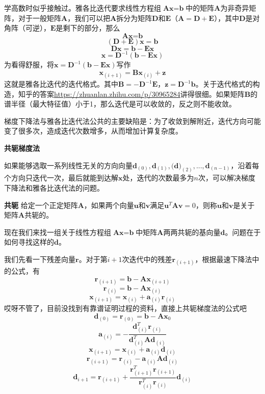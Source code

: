 \documentclass{article}
\begin{document}
					学高数时似乎接触过。雅各比迭代要求线性方程组$\textbf{A}\textbf{x}=\textbf{b}$中的矩阵$\textbf{A}$为非奇异矩阵，对于一般矩阵$\textbf{A}$，我们可以把$\textbf{A}$拆分为矩阵$\textbf{D}$和$\textbf{E}$（$\textbf{A}=\textbf{D}+\textbf{E}$），其中$\textbf{D}$是对角阵（可逆），$\textbf{E}$是剩下的部分，那么
					$$\textbf{A}\textbf{x}=\textbf{b}$$
					$$(\textbf{D}+\textbf{E})\textbf{x}=\textbf{b}$$
					$$\textbf{D}\textbf{x}=\textbf{b}-\textbf{E}\textbf{x}$$
					$$\textbf{x}=\textbf{D}^{-1}(\textbf{b}-\textbf{E}\textbf{x})$$
					为看得舒服，将$\textbf{x}=\textbf{D}^{-1}(\textbf{b}-\textbf{E}\textbf{x})$写作
					$$\textbf{x}_{(i+1)}=\textbf{B}\textbf{x}_{(i)}+\textbf{z}$$
					这就是雅各比迭代的迭代格式。其中$\textbf{B}=-\textbf{D}^{-1}\textbf{E}$，$\textbf{z}=\textbf{D}^{-1}\textbf{b}$。关于迭代格式的构造，知乎的答案\url{https://zhuanlan.zhihu.com/p/30965284}讲得很细。如果矩阵$\textbf{B}$的谱半径（最大特征值）小于1，那么迭代是可以收敛的，反之则不能收敛。
					
					梯度下降法与雅各比迭代法公共的主要缺陷是：为了收敛到解附近，迭代方向可能变了很多次，造成迭代次数增多，从而增加计算复杂度。
					
					\textbf{共轭梯度法}
					
					如果能够选取一系列线性无关的方向向量$\textbf{d}_{(0)},\textbf{d}_{(1)},\textbf{(d)}_{(2)},...,\textbf{d}_{(n-1)}$，沿着每个方向只迭代一次，最后就能到达解$\textbf{x}$处，迭代的次数最多为$n$次，可以解决梯度下降法和雅各比迭代法的问题。
					
					\textbf{共轭} 给定一个正定矩阵$\textbf{A}$，如果两个向量$\textbf{u}$和$\textbf{v}$满足$\textbf{u}^{T}\textbf{A}\textbf{v}=0$，则称$\textbf{u}$和$\textbf{v}$是关于矩阵$\textbf{A}$共轭的。
					
					现在我们来找一组关于线性方程组$\textbf{A}\textbf{x}=\textbf{b}$中矩阵$\textbf{A}$两两共轭的基向量$\textbf{d}$。问题在于如何寻找这样的$\textbf{d}$。
					
					我们先看一下残差向量$\textbf{r}$。对于第$i+1$次迭代中的残差$\textbf{r}_{(i+1)}$，根据最速下降法中的公式，有
					$$\textbf{r}_{(i+1)}=\textbf{b}-\textbf{A}\textbf{x}_{(i+1)}$$
					$$\textbf{r}_{(i)}=\textbf{b}-\textbf{A}\textbf{x}_{(i)}$$
					$$\textbf{x}_{(i+1)}=\textbf{x}_{(i)}+\textbf{a}_{(i)}\textbf{r}_{(i)}$$
					哎呀不管了，目前没找到有靠谱证明过程的资料，直接上共轭梯度法的公式吧
					$$\textbf{d}_{(0)}=\textbf{r}_{(0)}=\textbf{b}-\textbf{A}\textbf{x}_{0}$$
					$$\textbf{a}_{(i)}=-\frac{\textbf{d}^{T}_{(i)}\textbf{r}_{(i)}}{\textbf{d}^{T}_{(i)}\textbf{A}\textbf{d}_{(i)}}$$
					$$\textbf{x}_{(i+1)}=\textbf{x}_{(i)}+\textbf{a}_{(i)}\textbf{d}_{(i)}$$
					$$\textbf{r}_{(i+1)}=\textbf{r}_{(i)}-\textbf{a}_{(i)}\textbf{A}\textbf{d}_{(i)}$$
					$$\textbf{d}_{i+1}=\textbf{r}_{(i+1)}+\frac{\textbf{r}^{T}_{(i+1)}\textbf{r}_{(i+1)}}{\textbf{r}^{T}_{(i)}\textbf{r}_{(i)}}\textbf{d}_{(i)}$$
\end{document}
